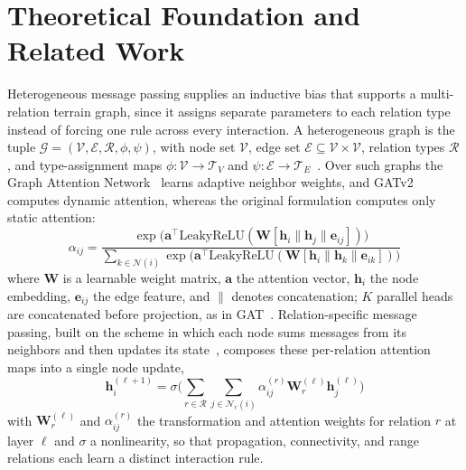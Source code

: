 \documentclass{ieeeaccess}
\begin{document}
\section{Theoretical Foundation and Related Work}
\label{sec:related_work}

Heterogeneous message passing supplies an inductive bias that supports a multi-relation terrain graph, since it assigns separate parameters to each relation type instead of forcing one rule across every interaction. A heterogeneous graph is the tuple $\mathcal{G} = (\mathcal{V}, \mathcal{E}, \mathcal{R}, \phi, \psi)$, with node set $\mathcal{V}$, edge set $\mathcal{E} \subseteq \mathcal{V} \times \mathcal{V}$, relation types $\mathcal{R}$, and type-assignment maps $\phi: \mathcal{V} \to \mathcal{T}_V$ and $\psi: \mathcal{E} \to \mathcal{T}_E$~\cite{zhai2025heterogeneous}. Over such graphs the Graph Attention Network~\cite{velickovic2018graph} learns adaptive neighbor weights, and GATv2~\cite{brody2022attentive} computes dynamic attention, whereas the original formulation computes only static attention:
\begin{equation}
\alpha_{ij} = \frac{\exp\!\bigl(\mathbf{a}^\top \mathrm{LeakyReLU}(\mathbf{W}[\mathbf{h}_i \| \mathbf{h}_j \| \mathbf{e}_{ij}])\bigr)}{\sum_{k \in \mathcal{N}(i)} \exp\!\bigl(\mathbf{a}^\top \mathrm{LeakyReLU}(\mathbf{W}[\mathbf{h}_i \| \mathbf{h}_k \| \mathbf{e}_{ik}])\bigr)}
\label{eq:gatv2}
\end{equation}
where $\mathbf{W}$ is a learnable weight matrix, $\mathbf{a}$ the attention vector, $\mathbf{h}_i$ the node embedding, $\mathbf{e}_{ij}$ the edge feature, and $\|$ denotes concatenation; $K$ parallel heads are concatenated before projection, as in GAT~\cite{velickovic2018graph}. Relation-specific message passing, built on the scheme in which each node sums messages from its neighbors and then updates its state~\cite{gilmer2017neural}, composes these per-relation attention maps into a single node update,
\begin{equation}
\mathbf{h}_i^{(\ell+1)} = \sigma\!\Biggl(\sum_{r \in \mathcal{R}} \sum_{j \in \mathcal{N}_r(i)} \alpha_{ij}^{(r)} \mathbf{W}_r^{(\ell)} \mathbf{h}_j^{(\ell)}\Biggr)
\label{eq:hetero_mp}
\end{equation}
with $\mathbf{W}_r^{(\ell)}$ and $\alpha_{ij}^{(r)}$ the transformation and attention weights for relation $r$ at layer $\ell$ and $\sigma$ a nonlinearity, so that propagation, connectivity, and range relations each learn a distinct interaction rule.
\end{document}
